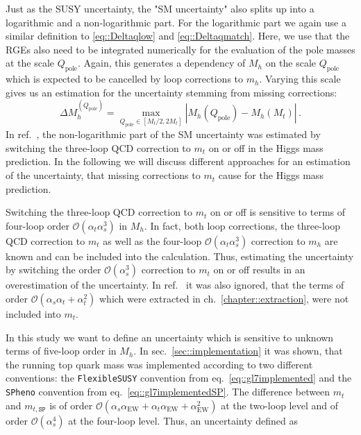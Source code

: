 \documentclass[a4paper,12pt]{book}
\begin{document}
Just as the SUSY uncertainty, the "SM uncertainty" also splits up  into a logarithmic and a non-logarithmic part. For the logarithmic part we again use a similar definition to \eqref{eq::Deltaqlow} and \eqref{eq::Deltaqmatch}. Here, we use that the RGEs also need to be integrated numerically for the evaluation of the pole masses at the scale $Q_\text{pole}$. Again, this generates a dependency of $M_h$ on the scale $Q_\text{pole}$ which is expected to be cancelled by loop corrections to $m_h$. Varying this scale gives us an estimation for the uncertainty stemming from missing corrections: 
\begin{equation}
\label{eq::Deltaqpole}
\Delta M_h^{(Q_\text{pole})}= \max_{Q_\text{pole} \in [M_t/2,2 M_t]} |M_h(Q_\text{pole}) - M_h(M_t)|\,.
\end{equation}
In ref.\ \cite{allanachvoigt}, the non-logarithmic part of the SM uncertainty was estimated by switching the three-loop QCD correction to $m_t$ on or off in the Higgs mass prediction. In the following we will discuss different approaches for an estimation of the uncertainty, that missing corrections to $m_t$ cause for the Higgs mass prediction.\par 
Switching the three-loop QCD correction to $m_t$ on or off is sensitive to terms of four-loop order $\mathcal{O}(\alpha_t \alpha_s^3)$ in $M_h$. In fact, both loop corrections, the three-loop QCD correction to $m_t$ as well as the four-loop $\mathcal{O}(\alpha_t\alpha_s^3)$ correction to $m_h$ are known and can be included into the calculation. Thus, estimating the uncertainty by switching the order $\mathcal{O}(\alpha_s^3)$ correction to $m_t$ on or off results in an overestimation of the uncertainty. In ref.\ \cite{allanachvoigt} it was also ignored, that the terms of order $\mathcal{O}(\alpha_s\alpha_t + \alpha_t^2)$ which were extracted in ch.\ \ref{chapter::extraction}, were not included into $m_t$.\par 
In this study we want to define an uncertainty which is sensitive to unknown terms of five-loop order in $M_h$. In sec.\ \ref{sec::implementation} it was shown, that the running top quark mass was implemented according to two different conventions: the \texttt{FlexibleSUSY} convention from eq.\ \eqref{eq::gl7implemented} and the \texttt{SPheno} convention from eq.\ \eqref{eq::gl7implementedSP}. The difference between $m_t$ and $m_{t,\texttt{SP}}$ is of order $\mathcal{O}(\alpha_s \alpha_\text{EW}+\alpha_t \alpha_\text{EW}+\alpha_\text{EW}^2)$ at the two-loop level and of order $\mathcal{O}(\alpha_s^4)$ at the four-loop level. Thus, an uncertainty defined as 
\end{document}
